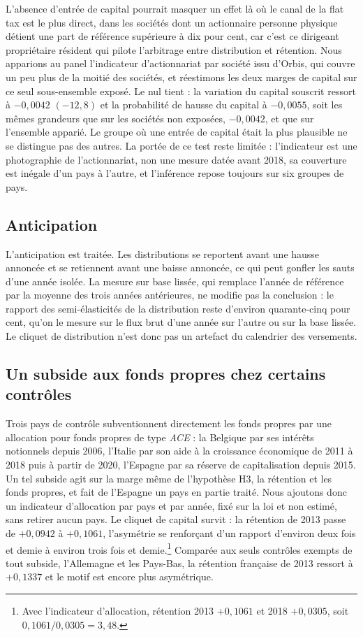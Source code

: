 L'absence d'entrée de capital pourrait masquer un effet là où le canal de la flat tax est le plus
direct, dans les sociétés dont un actionnaire personne physique détient une part de référence
supérieure à dix pour cent, car c'est ce dirigeant propriétaire résident qui pilote l'arbitrage entre
distribution et rétention. Nous apparions au panel l'indicateur d'actionnariat par société issu
d'Orbis, qui couvre un peu plus de la moitié des sociétés, et réestimons les deux marges de capital
sur ce seul sous-ensemble exposé. Le nul tient : la variation du capital souscrit ressort à
$-0{,}0042$ $(-12{,}8)$ et la probabilité de hausse du capital à $-0{,}0055$, soit les mêmes
grandeurs que sur les sociétés non exposées, $-0{,}0042$, et que sur l'ensemble apparié. Le groupe
où une entrée de capital était la plus plausible ne se distingue pas des autres. La portée de ce test
reste limitée : l'indicateur est une photographie de l'actionnariat, non une mesure datée avant 2018,
sa couverture est inégale d'un pays à l'autre, et l'inférence repose toujours sur six groupes de pays.

\subsection{Anticipation}

L'anticipation est traitée. Les distributions se reportent avant une hausse annoncée et se
retiennent avant une baisse annoncée, ce qui peut gonfler les sauts d'une année isolée. La mesure
sur base lissée, qui remplace l'année de référence par la moyenne des trois années antérieures, ne
modifie pas la conclusion : le rapport des semi-élasticités de la distribution reste d'environ
quarante-cinq pour cent, qu'on le mesure sur le flux brut d'une année sur l'autre ou sur la base
lissée. Le cliquet de distribution n'est donc pas un artefact du calendrier des versements.

\subsection{Un subside aux fonds propres chez certains contrôles}

Trois pays de contrôle subventionnent directement les fonds propres par une allocation pour fonds
propres de type \textit{ACE} : la Belgique par ses intérêts notionnels depuis 2006, l'Italie par son
aide à la croissance économique de 2011 à 2018 puis à partir de 2020, l'Espagne par sa réserve de
capitalisation depuis 2015. Un tel subside agit sur la marge même de l'hypothèse H3, la rétention et
les fonds propres, et fait de l'Espagne un pays en partie traité. Nous ajoutons donc un indicateur
d'allocation par pays et par année, fixé sur la loi et non estimé, sans retirer aucun pays. Le
cliquet de capital survit : la rétention de 2013 passe de $+0{,}0942$ à $+0{,}1061$, l'asymétrie se
renforçant d'un rapport d'environ deux fois et demie à environ trois fois et demie.\footnote{Avec
l'indicateur d'allocation, rétention 2013 $+0{,}1061$ et 2018 $+0{,}0305$, soit
$0{,}1061 / 0{,}0305 = 3{,}48$.} Comparée aux seuls contrôles exempts de tout subside, l'Allemagne et
les Pays-Bas, la rétention française de 2013 ressort à $+0{,}1337$ et le motif est encore plus
asymétrique.

